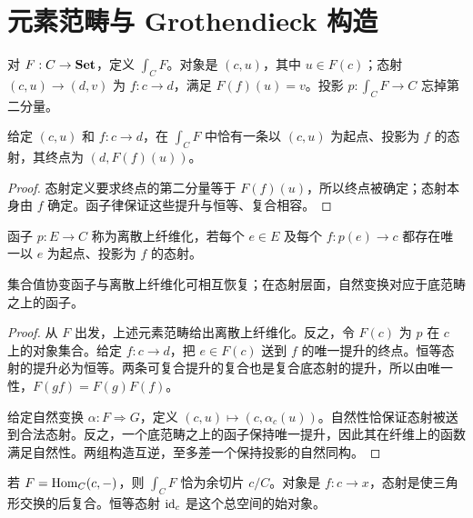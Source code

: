 \section{元素范畴与 Grothendieck 构造}
\begin{definition}[协变元素范畴]
对 $F:C\to\mathbf{Set}$，定义 $\int_C F$。对象是 $(c,u)$，其中 $u\in F(c)$；态射 $(c,u)\to(d,v)$ 为 $f:c\to d$，满足 $F(f)(u)=v$。投影 $p:\int_CF\to C$ 忘掉第二分量。
\end{definition}
\begin{proposition}[唯一的起点提升]
给定 $(c,u)$ 和 $f:c\to d$，在 $\int_CF$ 中恰有一条以 $(c,u)$ 为起点、投影为 $f$ 的态射，其终点为 $(d,F(f)(u))$。
\end{proposition}
\begin{proof}
态射定义要求终点的第二分量等于 $F(f)(u)$，所以终点被确定；态射本身由 $f$ 确定。函子律保证这些提升与恒等、复合相容。
\end{proof}
\begin{definition}[离散上纤维化]
函子 $p:E\to C$ 称为离散上纤维化，若每个 $e\in E$ 及每个 $f:p(e)\to c$ 都存在唯一以 $e$ 为起点、投影为 $f$ 的态射。
\end{definition}
\begin{theorem}[集合值函子与离散上纤维化]
集合值协变函子与离散上纤维化可相互恢复；在态射层面，自然变换对应于底范畴之上的函子。
\end{theorem}
\begin{proof}
从 $F$ 出发，上述元素范畴给出离散上纤维化。反之，令 $F(c)$ 为 $p$ 在 $c$ 上的对象集合。给定 $f:c\to d$，把 $e\in F(c)$ 送到 $f$ 的唯一提升的终点。恒等态射的提升必为恒等。两条可复合提升的复合也是复合底态射的提升，所以由唯一性，$F(gf)=F(g)F(f)$。

给定自然变换 $\alpha:F\Rightarrow G$，定义 $(c,u)\mapsto(c,\alpha_c(u))$。自然性恰保证态射被送到合法态射。反之，一个底范畴之上的函子保持唯一提升，因此其在纤维上的函数满足自然性。两组构造互逆，至多差一个保持投影的自然同构。
\end{proof}
\begin{example}[可表函子的总空间]
若 $F=\operatorname{Hom}_C(c,-)$，则 $\int_CF$ 恰为余切片 $c/C$。对象是 $f:c\to x$，态射是使三角形交换的后复合。恒等态射 $\operatorname{id}_c$ 是这个总空间的始对象。
\end{example}

